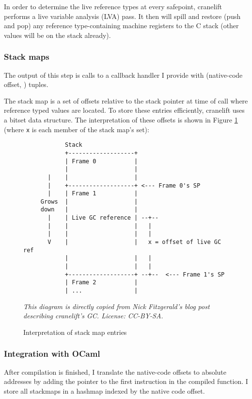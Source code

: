 In order to determine the live reference types at every safepoint, cranelift performs a live
variable analysis (LVA) pass. It then will spill and restore (push and pop) any reference
type-containing machine registers to the C stack (other values will be on the stack already).

\subsubsection{Stack maps}

The output of this step is calls to a callback handler I provide with (native-code offset,
) tuples.

The stack map is a set of offsets relative to the stack pointer at time of call where reference
typed values are located. To store these entries efficiently, cranelift uses a bitset data
structure. The interpretation of these offsets is shown in Figure \ref{fig:stack-frames} (where
\texttt{x}
is each member of the stack map's set):

\begin{figure}[h]
      \begin{verbatim}
            Stack
            +-------------------+
            | Frame 0           |
            |                   |
       |    |                   |
       |    +-------------------+ <--- Frame 0's SP
       |    | Frame 1           |
     Grows  |                   |
     down   |                   |
       |    | Live GC reference | --+--
       |    |                   |   |
       |    |                   |   |
       V    |                   |   x = offset of live GC ref
            |                   |   |
            |                   |   |
            +-------------------+ --+--  <--- Frame 1's SP
            | Frame 2           |
            | ...               |
\end{verbatim}

      \noindent\emph{
            This diagram is directly copied from Nick Fitzgerald's blog post \cite{refblog}
            describing
            cranelift's GC. License: CC-BY-SA.
      }
      \caption{Interpretation of stack map entries}
      \label{fig:stack-frames}
\end{figure}

\subsubsection{Integration with OCaml}

After compilation is finished, I translate the native-code offsets to absolute addresses by adding
the
pointer to the first instruction in the compiled function. I store all stackmaps in a hashmap
indexed by the native code offset.

